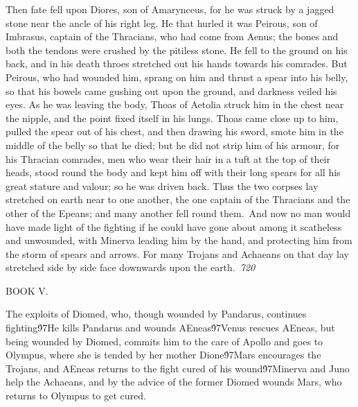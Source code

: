 {Then fate fell upon Diores, son of Amarynceus, for he was struck by a jagged stone near the ancle of his right leg. He that hurled it was Peirous, son of Imbrasus, captain of the Thracians, who had come from Aenus; the bones and both the tendons were crushed by the pitiless stone. He fell to the ground on his back, and in his death throes stretched out his hands towards his comrades. But Peirous, who had wounded him, sprang on him and thrust a spear into his belly, so that his bowels came gushing out upon the ground, and darkness veiled his eyes. As he was leaving the body, Thoas of Aetolia struck him in the chest near the nipple, and the point fixed itself in his lungs. Thoas came close up to him, pulled the spear out of his chest, and then drawing his sword, smote him in the middle of the belly so that he died; but he did not strip him of his armour, for his Thracian comrades, men who wear their hair in a tuft at the top of their heads, stood round the body and kept him off with their long spears for all his great stature and valour; so he was driven back. Thus the two corpses lay stretched on earth near to one another, the one captain of the Thracians and the other of the Epeans; and many another fell round them.\
And now no man would have made light of the fighting if he could have gone about among it scatheless and unwounded, with Minerva leading him by the hand, and protecting him from the storm of spears and arrows. For many Trojans and Achaeans on that day lay stretched side by side face downwards upon the earth.\
\pard{}\sl720\qc{}

  BOOK V.\
\pard\pardeftab720\qj{}

\fs25\fsmilli12800  The exploits of Diomed, who, though wounded by Pandarus, continues fighting\'97He kills Pandarus and wounds AEneas\'97Venus rescues AEneas, but being wounded by Diomed, commits him to the care of Apollo and goes to Olympus, where she is tended by her mother Dione\'97Mars encourages the Trojans, and AEneas returns to the fight cured of his wound\'97Minerva and Juno help the Achaeans, and by the advice of the former Diomed wounds Mars, who returns to Olympus to get cured.\
\pard{}\qj{}

}
